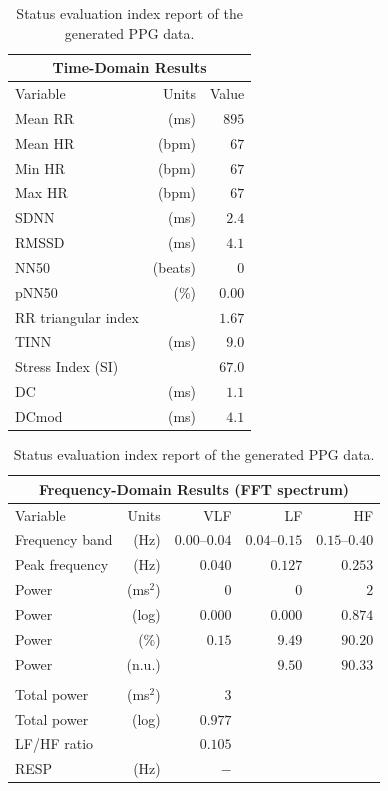 \documentclass[sigchi,authordraft]{acmart}
\begin{document}
\begin{table}[!t]
  \small
  \centering
  \caption{Status evaluation index report of the generated PPG data.}
  \begin{tabular}{lrr}
  \multicolumn{3}{c}{Time-Domain Results} \\
  \toprule
    Variable & Units & Value \\
    \midrule
    Mean RR & (ms) & $895$ \\
    Mean HR & (bpm) & $67$ \\
    Min HR & (bpm) & $67$ \\
    Max HR & (bpm) & $67$ \\
    SDNN & (ms) & $2.4$ \\
    RMSSD & (ms) & $4.1$ \\
    NN50 & (beats) & $0$ \\
    pNN50 & (\%) & $0.00$ \\
    RR triangular index & & $1.67$ \\
    TINN & (ms) & $9.0$ \\
    Stress Index (SI) & & $67.0$ \\
    DC & (ms) & $1.1$ \\
    DCmod & (ms) & $4.1$ \\
    \bottomrule
  \end{tabular}
  \begin{tabular}{lrrrr}
  \multicolumn{5}{c}{Frequency-Domain Results (FFT spectrum)} \\
  \toprule
    Variable & Units & VLF & LF & HF \\
    \midrule
    Frequency band & (Hz) & $0.00\text{--}0.04$ & $0.04\text{--}0.15$ & $0.15\text{--}0.40$ \\
    Peak frequency & (Hz) & $0.040$ & $0.127$ & $0.253$ \\
    Power & (ms${}^\text{2}$) & $0$ & $0$ & $2$ \\
    Power & (log) & $0.000$ & $0.000$ & $0.874$ \\
    Power & (\%) & $0.15$ & $9.49$ & $90.20$ \\
    Power & (n.u.) & & $9.50$ & $90.33$ \\
    \text{-}\text{-}\text{-}\text{-}\text{-}\text{-}\text{-}\text{-}\text{-}\text{-}\text{-}\text{-}\text{-} & & & & \\
    Total power & (ms${}^\text{2}$) & $3$ & & \\
    Total power & (log) & $0.977$ & & \\
    LF/HF ratio & & $0.105$ & & \\
    RESP & (Hz) & $-$ & & \\
    \bottomrule
  \end{tabular}
  \label{tab:report_generated}
\end{table}
\end{document}
